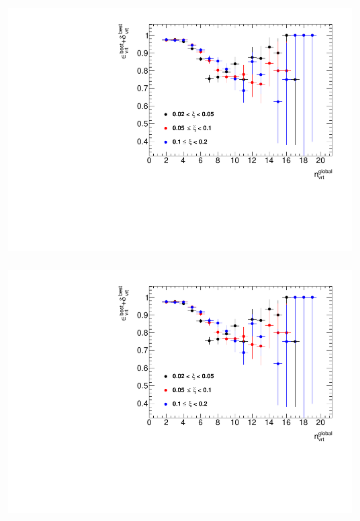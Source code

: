 \begin{figure}[h!]
	\centering
	\begin{subfigure}{.47\textwidth}
		\includegraphics[width=\textwidth,page=3]{chapters/chrgSTAR/img/vertex/vertexEffi_ksi.pdf}
	\end{subfigure}
	\begin{subfigure}{.47\textwidth}
		\includegraphics[width=\textwidth,page=4]{chapters/chrgSTAR/img/vertex/vertexEffi_ksi.pdf}
	\end{subfigure}
	\begin{subfigure}{.47\textwidth}

\end{subfigure}
\end{figure}
